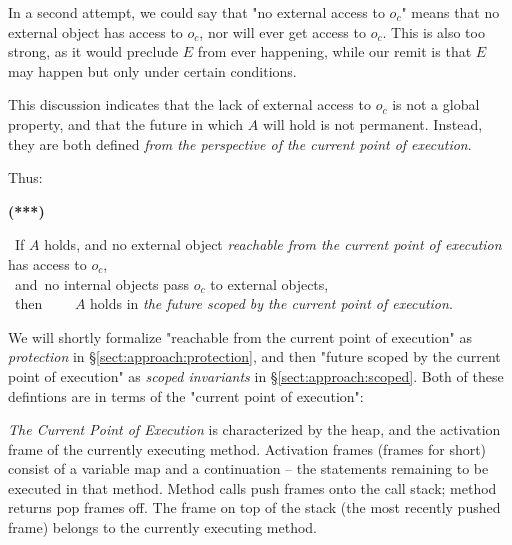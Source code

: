 {{In a second attempt, we could say that "no external access to  $o_c$" means that no external object has access to $o_c$, nor will ever get access to $o_c$. This is also too strong, as it would preclude $E$ from ever happening, while our remit is that $E$ may happen but only under certain conditions. 

This discussion indicates that the lack of external access to $o_c$ is not a global property, and that the future in which  $A$ will hold is not permanent. 
Instead, they are both defined \emph{from the perspective of the current point of execution}.

Thus:


\vspace{.1cm}

  \begin{minipage}{.05\textwidth}
   \textbf{(***)}
\end{minipage}
\hfill
\begin{minipage}{.95\textwidth}
\begin{flushleft}
\ If $A$ holds,   and  no external object  \emph{reachable from the current point of execution}  has access to $o_c$, \\  
\   and\   no  internal objects pass $o_c$ to external objects,  \\
\ then \ \ \  \ $A$ holds in  \emph{the future scoped by the current point of execution}.  
\end{flushleft}
\end{minipage}

\vspace{.2cm}
 
\noindent 

\noindent We will shortly formalize "reachable from the current point of execution" as
\emph{protection} in \S \ref{sect:approach:protection},
and then  "future scoped by the current point of execution"
as  \emph{scoped invariants} in \S \ref{sect:approach:scoped}.
Both of these defintions are in terms of the "current point of execution":

\noindent\emph{The Current Point of Execution}
is characterized by the heap, and   the activation frame of the currently executing method. 
Activation frames (frames for short) consist of a variable map and a continuation -- the statements remaining to be executed in that method.
Method calls push frames onto the call stack; method returns pop frames off.
The frame on top of the stack (the most recently pushed frame) 
belongs to the currently executing method.


}}
